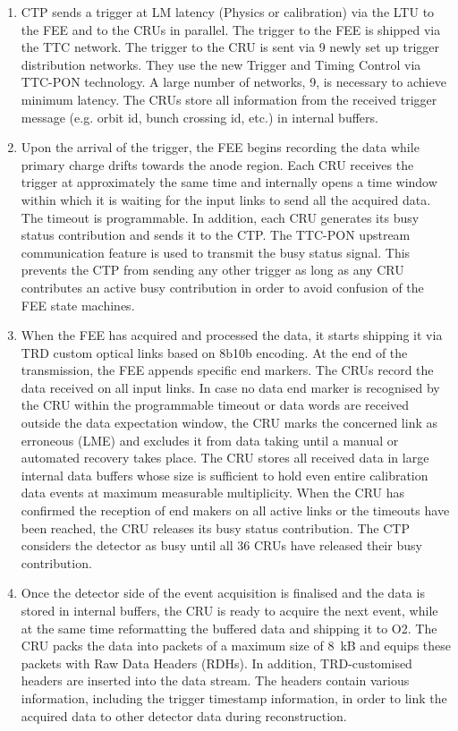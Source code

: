 \begin{enumerate}
    \item CTP sends a trigger at LM latency (Physics or calibration) via the LTU to the FEE and to the CRUs in parallel. The trigger to the FEE is shipped via the TTC network. The trigger to the CRU is sent via 9 newly set up trigger distribution networks. They use the new Trigger and Timing Control via TTC-PON technology. A large number of networks, 9, is necessary to achieve minimum latency. The CRUs store all information from the received trigger message (e.g. orbit id, bunch crossing id, etc.) in internal buffers.
    
    \item Upon the arrival of the trigger, the FEE begins recording the data while primary charge drifts towards the anode region. Each CRU receives the trigger at approximately the same time and internally opens a time window within which it is waiting for the input links to send all the acquired data. The timeout is programmable. In addition, each CRU generates its busy status contribution and sends it to the CTP. The TTC-PON upstream communication feature is used to transmit the busy status signal. This prevents the CTP from sending any other trigger as long as any CRU contributes an active busy contribution in order to avoid confusion of the FEE state machines.
    
    \item When the FEE has acquired and processed the data, it starts shipping it via TRD custom optical links based on 8b10b encoding. At the end of the transmission, the FEE appends specific end markers. The CRUs record the data received on all input links.
    In case no data end marker is recognised by the CRU within the programmable timeout or data words are received outside the data expectation window, the CRU marks the concerned link as erroneous (LME) and excludes it from data taking until a manual or automated recovery takes place. The CRU stores all received data in large internal data buffers whose size is sufficient to hold even entire calibration data events at maximum measurable multiplicity. When the CRU has confirmed the reception of end makers on all active links or the timeouts have been reached, the CRU releases its busy status contribution. The CTP considers the detector as busy until all 36 CRUs have released their busy contribution. 
    
    \item Once the detector side of the event acquisition is finalised and the data is stored in internal buffers, the CRU is ready to acquire the next event, while at the same time reformatting the buffered data and shipping it to O2. The CRU packs the data into packets of a maximum size of \SI{8}{\kilo B} and equips these packets with Raw Data Headers (RDHs). In addition, TRD-customised headers are inserted into the data stream. The headers contain various information, including the trigger timestamp information, in order to link the acquired data to other detector data during reconstruction.
    
    \end{enumerate}

